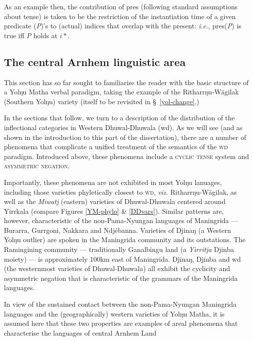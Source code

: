 As an example then, the contribution of \textcolor{forest}{\gls{pres}} (following standard assumptions about tense) is taken to be the restriction of the instantiation time of a given predicate (\textit{P})'s to (actual) indices that overlap with the present: \textit{i.e.}, \gls{pres}(\textit{P}) is true iff \textit{P} holds at $ i* $.

\subsection{The central Arnhem linguistic area}
This section has so far sought to familiarise the reader with the basic structure of a Yolŋu Matha verbal paradigm, taking the example of the Ritharrŋu-Wägilak (Southern Yolŋu) variety (itself to be revisited in \S~\ref{yol-change}.) 

In the sections that follow, we turn to a description of the distribution of the inflectional categories in Western Dhuwal-Dhuwala (\gls{wd}). As we will see (and as shown in the introduction to this part of the dissertation), there are a number of phenomena that complicate a unified treatment of the semantics of the \textsc{wd} paradigm. Introduced above, these phenomena include a \textsc{cyclic tense} system and \textsc{asymmetric negation}.


Importantly, these phenomena are not exhibited in most Yolŋu lanuages, including those varieties phyletically closest to \textsc{wd}, \textit{viz.} Ritharrŋu-Wägilak, as well as the \textit{Miwatj} (eastern) varieties of Dhuwal-Dhuwala centered around Yirrkala (compare Figures \ref{YM-phylo} \& \ref{DDvars}). Similar patterns are, however, characteristic of the non-Pama-Nyungan languages of Maningrida --- Burarra, Gurrgoni, Nakkara and Ndjébanna. Varieties of Djinaŋ (a Western Yolŋu outlier) are spoken in the Maningrida community and its outstations. The Ramingining community --- traditionally Ganalbingu land (a \textit{Yirritja} Djinba moiety) --- is approximately 100km east of Maningrida. Djinaŋ, Djinba and \gls{wd} (the westernmost varieties of Dhuwal-Dhuwala) all exhibit the cyclicity and asymmetric negation that is characteristic of the grammars of the Maningrida languages.

In view of the sustained contact between the non-Pama-Nyungan Maningrida languages and the (geographically) western varieties of Yolŋu Matha, it is assumed here that these two properties are examples of areal phenomena that characterise the languages of central Arnhem Land \citetext{see appendix 2 of \citealt{Waters1989} for a short investigation of this perspective.}


